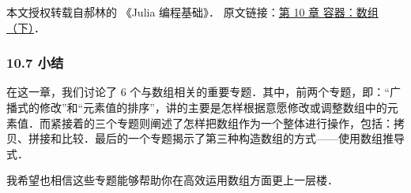
本文授权转载自郝林的 《Julia 编程基础》． 原文链接：\href{https://github.com/hyper0x/JuliaBasics/blob/master/book/ch10.md}{第 10 章 容器：数组（下）}．


\subsubsection{10.7 小结}

在这一章，我们讨论了 6 个与数组相关的重要专题．其中，前两个专题，即：“广播式的修改”和“元素值的排序”，讲的主要是怎样根据意愿修改或调整数组中的元素值．而紧接着的三个专题则阐述了怎样把数组作为一个整体进行操作，包括：拷贝、拼接和比较．最后的一个专题揭示了第三种构造数组的方式——使用数组推导式．

我希望也相信这些专题能够帮助你在高效运用数组方面更上一层楼．